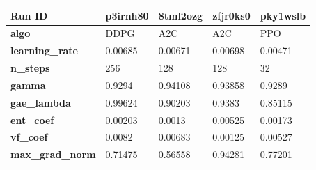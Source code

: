 \documentclass[../xlapes02]{subfiles}
\begin{document}
    \begin{table}[h!]
        \centering
        {\footnotesize
            \begin{tabular}{|l||l|l||l|l|}
                \hline
                \textbf{Run ID}                    & p3irnh80                                     & 8tml2ozg                                     & zfjr0ks0                                     & pky1wslb                                     \\ \hline
                \textbf{algo}                      & DDPG                                         & A2C                                          & A2C                                          & PPO                                          \\ \hline
                \textbf{learning\_rate}            & 0.00685                                      & 0.00671                                      & 0.00698                                      & 0.00471                                      \\ \hline
                \textbf{n\_steps}                  & 256                                          & 128                                          & 128                                          & 32                                           \\ \hline
                \textbf{gamma}                     & 0.9294                                       & 0.94108                                      & 0.93858                                      & 0.9289                                       \\ \hline
                \textbf{gae\_lambda}               & 0.99624                                      & 0.90203                                      & 0.9383                                       & 0.85115                                      \\ \hline
                \textbf{ent\_coef}                 & 0.00203                                      & 0.0013                                       & 0.00525                                      & 0.00173                                      \\ \hline
                \textbf{vf\_coef}                  & 0.0082                                       & 0.00683                                      & 0.00125                                      & 0.00527                                      \\ \hline
                \textbf{max\_grad\_norm}           & 0.71475                                      & 0.56558                                      & 0.94281                                      & 0.77201                                      \\ \hline

\end{tabular}}
\end{table}
\end{document}
